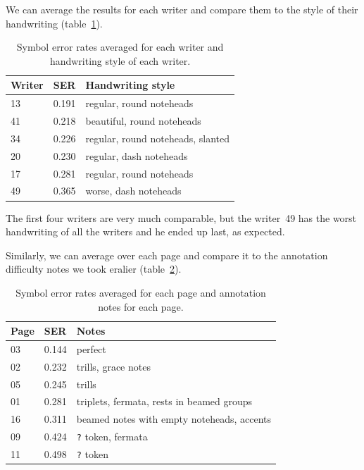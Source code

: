 We can average the results for each writer and compare them to the style of their handwriting (table~\ref{tab6:SerAverageForWriters}).

\newpage

\begin{table}[h] \centering
\begin{tabular}{lll}
\toprule
\textbf{Writer} & \textbf{SER} & \textbf{Handwriting style} \\
\midrule
13 & 0.191 & regular, round noteheads          \\
41 & 0.218 & beautiful, round noteheads        \\
34 & 0.226 & regular, round noteheads, slanted \\
20 & 0.230 & regular, dash noteheads           \\
17 & 0.281 & regular, round noteheads          \\
49 & 0.365 & worse, dash noteheads             \\
\bottomrule
\end{tabular}
\caption{Symbol error rates averaged for each writer and handwriting style of each writer.}
\label{tab6:SerAverageForWriters}
\end{table}

The first four writers are very much comparable, but the writer~49 has the worst handwriting of all the writers and he ended up last, as expected.

Similarly, we can average over each page and compare it to the annotation difficulty notes we took eralier (table~\ref{tab6:SerAverageForPages}).

\begin{table}[h] \centering
\begin{tabular}{lll}
\toprule
\textbf{Page} & \textbf{SER} & \textbf{Notes} \\
\midrule
03 & 0.144 & perfect                                    \\
02 & 0.232 & trills, grace notes                        \\
05 & 0.245 & trills                                     \\
01 & 0.281 & triplets, fermata, rests in beamed groups  \\
16 & 0.311 & beamed notes with empty noteheads, accents \\
09 & 0.424 & \verb`?` token, fermata                    \\
11 & 0.498 & \verb`?` token                             \\
\bottomrule
\end{tabular}
\caption{Symbol error rates averaged for each page and annotation notes for each page.}
\label{tab6:SerAverageForPages}
\end{table}

